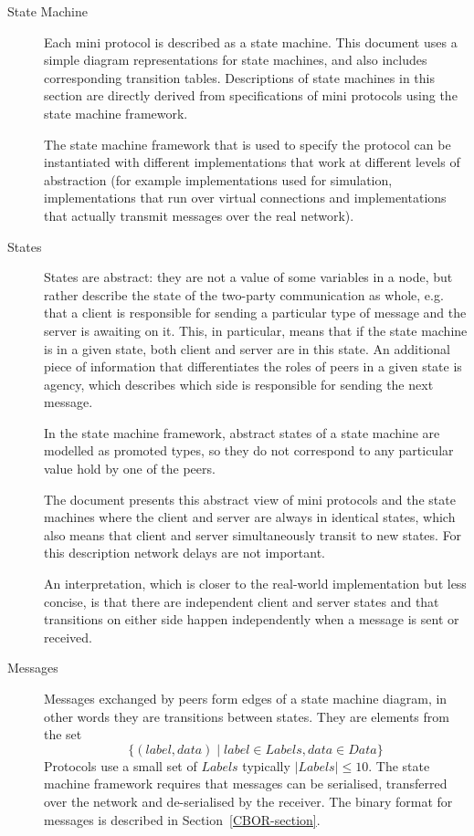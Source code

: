 \documentclass{report}
\theoremstyle{definition}{
  \newtheorem{lemma}{Lemma}[section] %
  \newtheorem{definition}[lemma]{Definition}
}
\theoremstyle{theorem}{
  \newtheorem{invariant}[lemma]{Invariant}
  \newtheorem{proofobligation}[lemma]{Proof Obligation}
}
\numberwithin{equation}{lemma}
\begin{document}
\begin{description}
\item[State Machine]
  Each mini protocol is described as a state machine.
  This document uses a simple diagram representations for state machines, and
  also includes corresponding transition tables.
  Descriptions of state machines in this section are directly derived from
  specifications of mini protocols using the state machine framework.

  The state machine framework that is used to specify the protocol can be instantiated
  with different implementations that work at different levels of abstraction
  (for example implementations used for simulation, implementations that run over virtual
  connections and implementations that actually transmit messages over the real network).
  

\item[States]
  States are abstract: they are not a value of some variables in a node, but
  rather describe the state of the two-party communication as whole, e.g.
  that a client is responsible for sending a particular type of message and
  the server is awaiting on it.  This, in particular, means that if the state
  machine is in a given state, both client and server are in this state.
  An additional piece of information that differentiates the roles of peers in
  a given state is agency, which describes which side is responsible for
  sending the next message.

  In the state machine framework, abstract states of a state machine are
  modelled as promoted types, so they do not correspond to any particular
  value hold by one of the peers.

  The document presents this abstract view of mini protocols and the state
  machines where the client and server are always in identical states, which
  also means that client and server simultaneously transit to new states.
  For this description network delays are not important.

  An interpretation, which is closer to the real-world implementation but
  less concise, is that there are independent client and server states
  and that transitions on either side happen independently when a message is sent or received.

\item[Messages]
  Messages exchanged by peers form edges of a state machine diagram, in other
  words they are transitions between states.
  They are elements from the set
  $$\{(label, data) \mid label \in Labels, data \in Data\}$$
  Protocols use a small set of $Labels$ typically $|Labels| \leq 10$.
  The state machine framework requires that messages can be serialised,
  transferred over the network and de-serialised by the receiver.
  The binary format for messages is described in Section~\ref{CBOR-section}.


\end{description}
\end{document}
